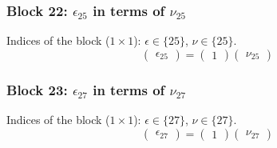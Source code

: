 \subsubsection{Block 22: $\epsilon_{25}$ in terms of $\nu_{25}$}
Indices of the block ($1\times 1$): $\epsilon \in \{25\}$, $\nu \in \{25\}$.
\[
\begin{pmatrix}
\epsilon_{25}
\end{pmatrix}
=
\begin{pmatrix}
1
\end{pmatrix}
\begin{pmatrix}
\nu_{25}
\end{pmatrix}
\]

\subsubsection{Block 23: $\epsilon_{27}$ in terms of $\nu_{27}$}
Indices of the block ($1\times 1$): $\epsilon \in \{27\}$, $\nu \in \{27\}$.
\[
\begin{pmatrix}
\epsilon_{27}
\end{pmatrix}
=
\begin{pmatrix}
1
\end{pmatrix}
\begin{pmatrix}
\nu_{27}
\end{pmatrix}
\]

